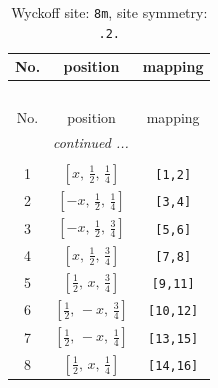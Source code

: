 \documentclass[fleqn,8pt]{jsarticle}
\begin{document}
\begin{longtable}{ccc}
\caption{Wyckoff site: {\tt 8m}, site symmetry: {\tt .2.}}
 \\
 \hline \hline
No. & position & mapping \\ \hline \endfirsthead

\multicolumn{2}{l}{\tablename\ \thetable{}} \\
 \hline \hline
No. & position & mapping \\ \hline \endhead

 \hline \hline
\multicolumn{2}{r}{\footnotesize\it continued ...} \\ \endfoot

 \hline \hline
\multicolumn{2}{r}{} \\ \endlastfoot

1 & $\left[ x,\, \frac{1}{2},\, \frac{1}{4} \right]$ & {\tt [1,2]} \\ \hline
2 & $\left[ - x,\, \frac{1}{2},\, \frac{1}{4} \right]$ & {\tt [3,4]} \\ \hline
3 & $\left[ - x,\, \frac{1}{2},\, \frac{3}{4} \right]$ & {\tt [5,6]} \\ \hline
4 & $\left[ x,\, \frac{1}{2},\, \frac{3}{4} \right]$ & {\tt [7,8]} \\ \hline
5 & $\left[ \frac{1}{2},\, x,\, \frac{3}{4} \right]$ & {\tt [9,11]} \\ \hline
6 & $\left[ \frac{1}{2},\, - x,\, \frac{3}{4} \right]$ & {\tt [10,12]} \\ \hline
7 & $\left[ \frac{1}{2},\, - x,\, \frac{1}{4} \right]$ & {\tt [13,15]} \\ \hline
8 & $\left[ \frac{1}{2},\, x,\, \frac{1}{4} \right]$ & {\tt [14,16]} \\
\end{longtable}
\renewcommand{\arraystretch}{1.2}
\end{document}
